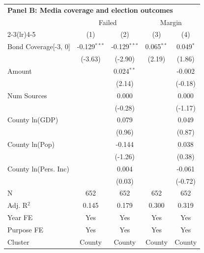 \begingroup
\centering
\begin{tabular*}{\textwidth}{@{\extracolsep{\fill}}lcccc}
\multicolumn{5}{l}{\textbf{Panel B: Media coverage and election outcomes}}\\

\addlinespace
   \toprule
    & \multicolumn{2}{c}{Failed} & \multicolumn{2}{c}{Margin}\\
   \cmidrule(lr){2-3}\cmidrule(lr){4-5}
                        & (1)            & (2)            & (3)          & (4)\\  
   \midrule 
   Bond Coverage[-3, 0] & -0.129$^{***}$ & -0.129$^{***}$ & 0.065$^{**}$ & 0.049$^{*}$\\   
                        & (-3.63)       & (-2.90)       & (2.19)      & (1.86)\\   
   Amount               &                & 0.024$^{**}$   &              & -0.002\\   
                        &                & (2.14)        &              & (-0.18)\\   
   Num Sources          &                & 0.000          &              & 0.000\\   
                        &                & (-0.28)       &              & (-1.17)\\   
   County ln(GDP)       &                & 0.079          &              & 0.049\\   
                        &                & (0.96)        &              & (0.87)\\   
   County ln(Pop)       &                & -0.144         &              & 0.038\\   
                        &                & (-1.26)       &              & (0.38)\\   
   County ln(Pers. Inc) &                & 0.004          &              & -0.061\\   
                        &                & (0.03)        &              & (-0.72)\\   
   \hline
   N         & 652            & 652            & 652          & 652\\  
   Adj. R$^2$       & 0.145          & 0.179          & 0.300        & 0.319\\  
   Year FE              & Yes            & Yes            & Yes          & Yes\\  
   Purpose FE           & Yes            & Yes            & Yes          & Yes\\  
   Cluster              & County & County & County & County\\  
   \bottomrule
\end{tabular*}
\par\endgroup
